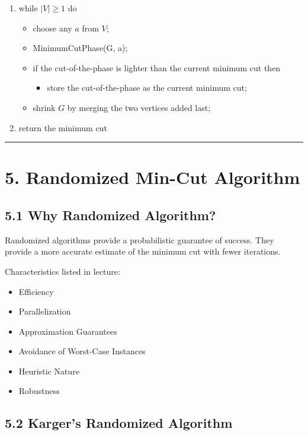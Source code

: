 \documentclass[12pt]{article}
\begin{document}
\begin{enumerate}
    \item while \( |V| \ge 1 \) do
    \begin{itemize}
        \item choose any \( a \) from \( V \);
        \item MinimumCutPhase(G, a);
        \item if the cut-of-the-phase is lighter than the current minimum cut then
        \begin{itemize}
            \item store the cut-of-the-phase as the current minimum cut;
        \end{itemize}
        \item shrink \( G \) by merging the two vertices added last;
    \end{itemize}
    \item return the minimum cut
\end{enumerate}

\hrule
\vspace{0.5cm}

\section*{5. Randomized Min-Cut Algorithm}

\subsection*{5.1 Why Randomized Algorithm?}

Randomized algorithms provide a probabilistic guarantee of success. They provide a more accurate estimate of the minimum cut with fewer iterations.

Characteristics listed in lecture:

\begin{itemize}
    \item Efficiency
    \item Parallelization
    \item Approximation Guarantees
    \item Avoidance of Worst-Case Instances
    \item Heuristic Nature
    \item Robustness
\end{itemize}

\subsection*{5.2 Karger’s Randomized Algorithm}
\end{document}
